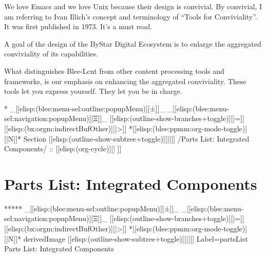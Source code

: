 \begin{whenOrg}
\begin{verblatex}
\begin{frame}[fragile,plain,label=aggregateConviviality]
{  We love Emacs and we love Unix because their design is convivial.
  By convivial, I am referring to Ivan Illich's  concept and terminology of ``Tools for Conviviality''.
  It was first published in 1973. It's a must read.

  A goal of the design of the ByStar Digital Ecosystem is to enlarge the aggregated conviviality of its
  capabilities.

  What distinguishes Blee-Lcnt from other content processing tools and frameworks, is our emphasis on
  enhancing the aggregated conviviality. These tools let you express yourself. They let you be in charge.

}

\end{frame}
\end{verblatex}


\begin{whenOrg}
*  _[[elisp:(blee:menu-sel:outline:popupMenu)][±]]_ _[[elisp:(blee:menu-sel:navigation:popupMenu)][Ξ]]_ [[elisp:(outline-show-branches+toggle)][|=]] [[elisp:(bx:orgm:indirectBufOther)][|>]] *[[elisp:(blee:ppmm:org-mode-toggle)][|N]]*  Section    [[elisp:(outline-show-subtree+toggle)][||]]   /Parts List: Integrated Components/ ::  [[elisp:(org-cycle)][| ]]
\end{whenOrg}

\section{Parts List: Integrated Components}


\begin{whenOrg}
*****  _[[elisp:(blee:menu-sel:outline:popupMenu)][±]]_ _[[elisp:(blee:menu-sel:navigation:popupMenu)][Ξ]]_ [[elisp:(outline-show-branches+toggle)][|=]] [[elisp:(bx:orgm:indirectBufOther)][|>]] *[[elisp:(blee:ppmm:org-mode-toggle)][|N]]*  derivedImage [[elisp:(outline-show-subtree+toggle)][||]] Label=partsList Parts List: Integrated Components
\end{whenOrg}

\begin{htmlonly}


\end{htmlonly}
\end{whenOrg}
